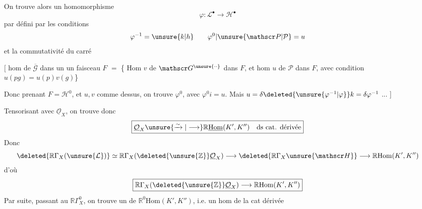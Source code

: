 On trouve alors un homomorphisme
\[
 \varphi:\mathcal L^\bullet\longrightarrow\mathscr H^\bullet
\]
par
défini par les conditions
\[
 \varphi^{-1}=\unsure{k|h}\qquad \varphi^0|\unsure{\mathscr P|\mathcal P}=u
\]
et la commutativité du carré

[  hom de $\overline{\mathscr G}$ dans un un faisceau $F$ $=$ \{ Hom $v$ de $\mathscr G^{\unsure{\cdot\cdot}}$ dans $F$, et hom $u$ de $\mathscr P$ dans $F$, avec condition $u(pg)=u(p)v(g)$\}

Donc prenant  $F=\mathscr H^0$, et $u,v$ comme dessus, on trouve $\varphi^0$, avec $\varphi^0 i=u$. Mais $u=\delta\deleted{\unsure{\varphi^{-1}|\varphi}}k=\delta\varphi^{-1}$ ... ]

Tensorisant avec $\underline{\mathcal O}_X$, on trouve
 donc
\[
 \boxed{\underline{\mathcal O}_X\unsure{\xrightarrow{\sim}|\longrightarrow}
 \mathbb R\underline{\mathrm{Hom}}(K',K'')\quad\text{ds cat. dérivée}}
\]
Donc
\[
 \deleted{\mathbb R\Gamma_X(\unsure{\mathcal L})}\simeq
 \mathbb R\Gamma_X(\deleted{\unsure{\mathbb Z}}\underline{\mathcal O}_X)\longrightarrow
 \deleted{\mathbb R\Gamma_X\unsure{\mathscr H}}\longrightarrow\mathbb R\mathrm{Hom}(K',K'')
\]
d'où
\[
 \boxed{\mathbb R\Gamma_X(\deleted{\unsure{\mathbb Z}}\underline{\mathcal O}_X)\longrightarrow\mathbb R\mathrm{Hom}(K',K'')}
\]
Par suite,  passant au $\mathbb R\Gamma^0_X$, on trouve un  de $\mathbb R^0\mathrm{Hom}(K',K'')$, i.e. un hom de la cat dérivée

